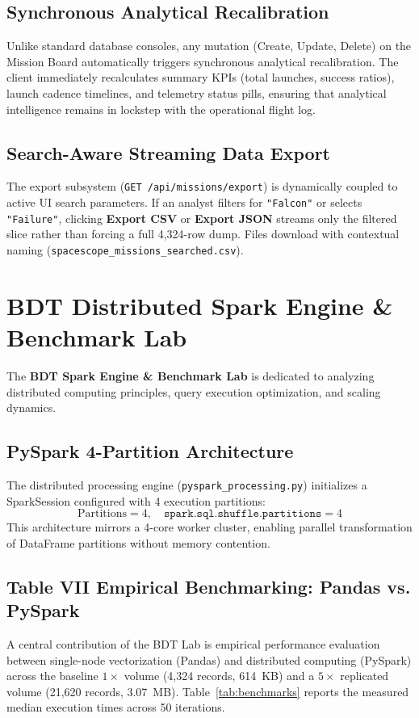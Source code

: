 \documentclass[10pt]{article}
\begin{document}
\subsection{Synchronous Analytical Recalibration}
Unlike standard database consoles, any mutation (Create, Update, Delete) on the Mission Board automatically triggers synchronous analytical recalibration. The client immediately recalculates summary KPIs (total launches, success ratios), launch cadence timelines, and telemetry status pills, ensuring that analytical intelligence remains in lockstep with the operational flight log.

\subsection{Search-Aware Streaming Data Export}
The export subsystem (\texttt{GET /api/missions/export}) is dynamically coupled to active UI search parameters. If an analyst filters for \texttt{"Falcon"} or selects \texttt{"Failure"}, clicking \textbf{Export CSV} or \textbf{Export JSON} streams only the filtered slice rather than forcing a full 4,324-row dump. Files download with contextual naming (\texttt{spacescope\_missions\_searched.csv}).

\section{BDT Distributed Spark Engine \& Benchmark Lab}

The \textbf{BDT Spark Engine \& Benchmark Lab} is dedicated to analyzing distributed computing principles, query execution optimization, and scaling dynamics.

\subsection{PySpark 4-Partition Architecture}
The distributed processing engine (\texttt{pyspark\_processing.py}) initializes a SparkSession configured with 4 execution partitions:
\begin{equation}
    \text{Partitions} = 4, \quad \texttt{spark.sql.shuffle.partitions} = 4
\end{equation}
This architecture mirrors a 4-core worker cluster, enabling parallel transformation of DataFrame partitions without memory contention.

\subsection{Table VII Empirical Benchmarking: Pandas vs. PySpark}
A central contribution of the BDT Lab is empirical performance evaluation between single-node vectorization (Pandas) and distributed computing (PySpark) across the baseline $1\times$ volume (4,324 records, 614~KB) and a $5\times$ replicated volume (21,620 records, 3.07~MB). Table~\ref{tab:benchmarks} reports the measured median execution times across 50 iterations.
\end{document}
